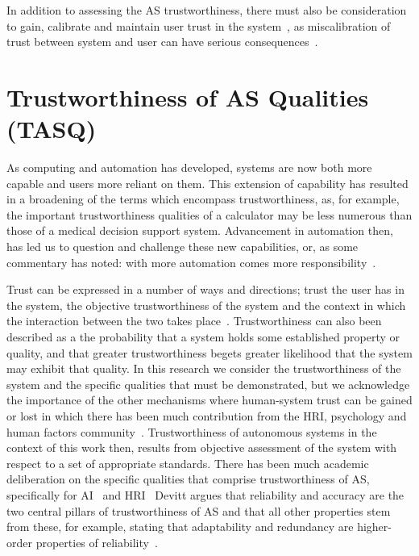 In addition to assessing the AS trustworthiness, there must also be consideration to gain, calibrate and maintain user trust in the system~\cite{kok2020trust, Chiou2021}, as miscalibration of trust between system and user can have serious consequences~\cite{kok2020trust}. 





\section{Trustworthiness of AS Qualities (TASQ)}\label{sec:tasq}

As computing and automation has developed, systems are now both more capable and users more reliant on them. This extension of capability has resulted in a broadening of the terms which encompass trustworthiness, as, for example, the important trustworthiness qualities of a calculator may be less numerous than those of a medical decision support system. Advancement in automation then, has led us to question and challenge these new capabilities, or, as some commentary has noted: with more automation comes more responsibility~\cite{Yazdanpanah2021}. 

Trust can be expressed in a number of ways and directions; trust the user has in the system, the objective trustworthiness of the system and the context in which the interaction between the two takes place~\cite{Hancock2021}. 
%
Trustworthiness can also been described as a the probability that a system holds some established property or quality, and that greater trustworthiness begets greater likelihood that the system may exhibit that quality. 
%
In this research we consider the trustworthiness of the system and the specific qualities that must be demonstrated, but we acknowledge the importance of the other mechanisms where human-system trust can be gained or lost in which there has been much contribution from the HRI, psychology and human factors community~\cite{Floridi2019,Lee2004,kok2020trust,Chiou2021,Kohn2021,kraus2022trustworthy}. 
%
Trustworthiness of autonomous systems in the context of this work then, results from objective assessment of the system with respect to a set of appropriate standards. 
%
There has been much academic deliberation on the specific qualities that comprise trustworthiness of AS, specifically for AI~\cite{Thiebes2021,Wing2021} and HRI~\cite{kraus2022trustworthy,atkinson2012trust}
%
Devitt argues that reliability and accuracy are the two central pillars of trustworthiness of AS and that all other properties stem from these, for example, stating that adaptability and redundancy are higher-order properties of reliability~\cite{devitt2018trustworthiness}. 

